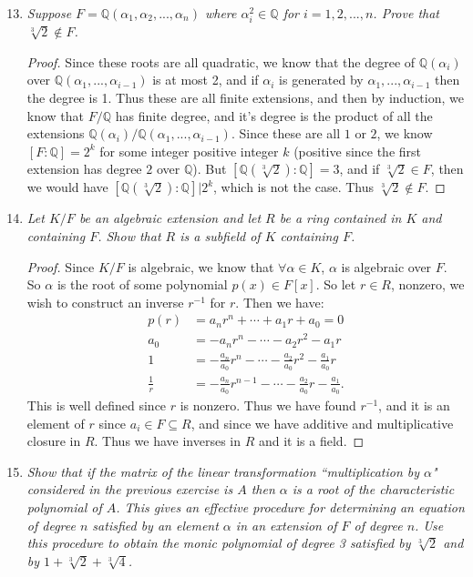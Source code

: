 \documentclass[10pt,oneside,reqno]{amsart}
\theoremstyle{plain}
\theoremstyle{definition}
\theoremstyle{remark}
\theoremstyle{plain}
\newcommand{\sub}{\subseteq}
\newcommand{\Q}{\mathbb{Q}}
\newcommand{\bee}{\begin{equation}\begin{aligned}}
\newcommand{\eee}{\end{aligned}\end{equation}}
\newcommand{\fracc}{\frac}
\begin{document}
\begin{enumerate}[label=\arabic*.]
\setcounter{enumi}{12}

\item \textit{Suppose $F = \Q(\alpha_1,\alpha_2,...,\alpha_n)$ where $\alpha_i^2 \in \Q$ for $i = 1,2,...,n$. Prove that $\sqrt[3]{2} \notin F$. }

\begin{proof}
Since these roots are all quadratic, we know that the degree of $\Q(\alpha_i)$ over $\Q(\alpha_1,...,\alpha_{i - 1})$ is at most 2, and if $\alpha_i$ is generated by $\alpha_1,...,\alpha_{i - 1}$ then the degree is 1. Thus these are all finite extensions, and then by induction, we know that $F/\Q$ has finite degree, and it's degree is the product of all the extensions $\Q(\alpha_i)/\Q(\alpha_1,...,\alpha_{i - 1})$. Since these are all $1$ or $2$, we know $[F:\Q] = 2^k$ for some integer positive integer $k$ (positive since the first extension has degree $2$ over $\Q$). But $[\Q(\sqrt[3]{2}):\Q] = 3$, and if $\sqrt[3]{2} \in F$, then we would have $[\Q(\sqrt[3]{2}):\Q]|2^k$, which is not the case. Thus $\sqrt[3]{2} \notin F$. 
\end{proof}

\setcounter{enumi}{15}

\item \textit{Let $K/F$ be an algebraic extension and let $R$ be a ring contained in $K$ and containing $F$. Show that $R$ is a subfield of $K$ containing $F$. }

\begin{proof}
Since $K/F$ is algebraic, we know that $\forall \alpha \in K$, $\alpha$ is algebraic over $F$. So $\alpha$ is the root of some polynomial $p(x) \in F[x]$. So let $r \in R$, nonzero, we wish to construct an inverse $r^{-1}$ for $r$. Then we have:
\bee
p(r) &= a_nr^n + \cdots + a_1r + a_0 = 0\\
a_0 &= -a_nr^n - \cdots - a_2r^2 - a_1r\\
1 &= -\fracc{a_n}{a_0} r^n - \cdots - \fracc{a_2}{a_0}r^2 - \fracc{a_1}{a_0}r\\
\fracc{1}{r} &= -\fracc{a_n}{a_0} r^{n- 1} - \cdots - \fracc{a_2}{a_0}r - \fracc{a_1}{a_0}. 
\eee
This is well defined since $r$ is nonzero. Thus we have found $r^{-1}$, and it is an element of $r$ since $a_i \in F \sub R$, and since we have additive and multiplicative closure in $R$. Thus we have inverses in $R$ and it is a field. 
\end{proof}

\setcounter{enumi}{19}

\item \textit{Show that if the matrix of the linear transformation ``multiplication by $\alpha$" considered in the previous exercise is $A$ then $\alpha$ is a root of the characteristic polynomial of $A$. This gives an effective procedure for determining an equation of degree $n$ satisfied by an element $\alpha$ in an extension of $F$ of degree $n$. Use this procedure to obtain the monic polynomial of degree 3 satisfied by $\sqrt[3]{2}$ and by $1 + \sqrt[3]{2} + \sqrt[3]{4}$. }


\end{enumerate}
\end{document}
